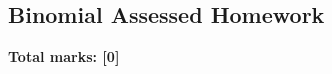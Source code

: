 \documentclass[../s1]{subfiles}
\begin{document}
\subsection*{Binomial Assessed Homework}
\thispagestyle{fancy}



\begin{flushright}
\textbf{Total marks: [0]}
\end{flushright}
\end{document}
